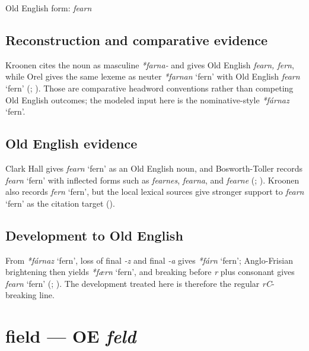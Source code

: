 \documentclass[
  british,
  a4paper,
  openany]{book}
\providecommand{\Recon}[1]{\emph{*#1}}
{\catcode`→=\active \global\def→{\ensuremath{\rightarrow}}}
\providecommand{\texorpdfstring}[2]{#1}
\providecommand{\Recon}[1]{\emph{*#1}}
{\catcode`→=\active \global\def→{\ensuremath{\rightarrow}}}
\begin{document}
Old English form: \emph{fearn}

\subsection{Reconstruction and comparative
evidence}\label{reconstruction-and-comparative-evidence-16}

Kroonen cites the noun as masculine \emph{*farna-} and gives Old English
\emph{fearn, fern}, while Orel gives the same lexeme as neuter
\Recon{farnan} `fern' with Old English {\emph{fearn}} `fern'
(; ). Those are comparative headword conventions rather than
competing Old English outcomes; the modeled input here is the
nominative-style \Recon{fárnaz} `fern'.

\subsection{Old English evidence}\label{old-english-evidence-16}

Clark Hall gives {\emph{fearn}} `fern' as an Old English noun, and
Bosworth-Toller records {\emph{fearn}} `fern' with inflected forms such
as \emph{fearnes}, \emph{fearna}, and \emph{fearne}
(;
).
Kroonen also records {\emph{fern}} `fern', but the local lexical sources
give stronger support to {\emph{fearn}} `fern' as the citation target
().

\subsection{Development to Old
English}\label{development-to-old-english-16}

From \Recon{fárnaz} `fern', loss of final \emph{-z} and final \emph{-a}
gives \Recon{fárn} `fern'; Anglo-Frisian brightening then yields
\Recon{færn} `fern', and breaking before \emph{r} plus consonant gives
{\emph{fearn}} `fern' (;
). The development
treated here is therefore the regular \emph{rC}-breaking line.

\section{\texorpdfstring{field --- OE
\emph{feld}}{field --- OE feld}}\label{field-oe-feld}
\end{document}
